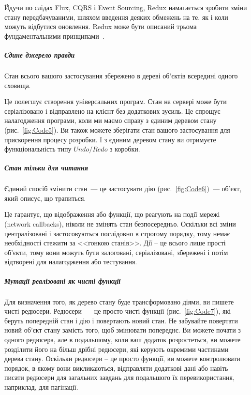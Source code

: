 Йдучи по слідах Flux, CQRS і Event Sourcing, Redux намагається зробити зміни стану передбачуваними, шляхом введення деяких обмежень на те, як і коли можуть відбутися оновлення. Redux може бути описаний трьома фундаментальними принципами~\cite{davidgeary2019}.

\subparagraph{Єдине джерело правди}

Стан всього вашого застосування збережено в дереві об'єктів всередині одного сховища.

Це полегшує створення універсальних програм. Стан на сервері може бути серіалізовано і відправлено на клієнт без додаткових зусиль. Це спрощує налагодження програми, коли ми маємо справу з єдиним деревом стану (рис.~\ref{fig:Code5}). Ви також можете зберігати стан вашого застосування для прискорення процесу розробки. І з єдиним деревом стану ви отримуєте функціональність типу $Undo / Redo$ з коробки.


\subparagraph{Стан тільки для читання}


Єдиний спосіб змінити стан~--- це застосувати дію (рис.~\ref{fig:Code6})~--- об'єкт, який описує, що трапиться. 

Це гарантує, що відображення або функції, що реагують на події мережі (network callbacks), ніколи не змінять стан безпосередньо. Оскільки всі зміни централізовані і застосовуються послідовно в строгому порядку, тому немає необхідності стежити за <<гонкою станів>>. Дії -- це всього лише прості об'єкти, тому вони можуть бути залоговані, серіалізовані, збережені і потім відтворені для налагодження або тестування.

\subparagraph{Мутації реалізовані як чисті функції}


Для визначення того, як дерево стану буде трансформовано діями, ви пишете чисті редюсери.
Редюсери~--- це просто чисті функції (рис.~\ref{fig:Code7}), які беруть попередній стан і дію і повертають новий стан. Не забувайте повертати новий об'єкт стану замість того, щоб змінювати попереднє. Ви можете почати з одного редюсера, але в подальшому, коли ваш додаток розростеться, ви можете розділити його на більш дрібні редюсери, які керують окремими частинами дерева стану. Оскільки редюсери -- це просто функції, ви можете контролювати порядок, в якому вони викликаються, відправляти додаткові дані або навіть писати редюсери для загальних завдань для подальшого їх перевикористання, наприклад, для пагінації.

